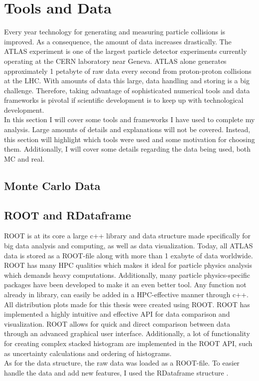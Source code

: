 \section{Tools and Data}
Every year technology for generating and measuring particle collisions is improved. 
As a consequence, the amount of data increases drastically. The ATLAS experiment
is one of the largest particle detector experiments currently operating at the 
CERN laboratory near Geneva. ATLAS alone generates approximately 1 petabyte of raw
data every second from proton-proton collisions at the \ac{LHC}. 
With amounts of data this large, data handling and storing is a big challenge. 
Therefore, taking advantage of sophisticated numerical tools and data frameworks is
pivotal if scientific development is to keep up with technological development.
\\
In this section I will cover some tools and frameworks I have used to 
complete my analysis. Large amounts of details and explanations will not be covered. 
Instead, this section will highlight which tools were used and some motivation
for choosing them. Additionally, I will cover some details regarding the data
being used, both \ac{MC} and real.
\subsection{Monte Carlo Data}
\subsection{ROOT and RDataframe}
ROOT \cite{ROOT} is at its core a large c++ library and data structure made specifically for big data
analysis and computing, as well as data visualization. Today, all ATLAS data is stored as a ROOT-file along
with more than 1 exabyte of data worldwide. ROOT has many \ac{HPC} qualities which makes it ideal for particle
physics analysis which demands heavy computations. Additionally, many particle physics-specific packages
have been developed to make it an even better tool. Any function not already in library,
can easily be added in a \ac{HPC}-effective manner through c++.
\\
All distribution plots made for this thesis were created using ROOT. ROOT has implemented a highly intuitive and
effective \ac{API} for data comparison and visualization. ROOT allows for quick and direct 
comparison between data through an advanced graphical user interface. Additionally, a lot of
functionality for creating complex stacked histogram are implemented in the ROOT \ac{API}, such
as uncertainty calculations and ordering of histograms.
\\
As for the data structure, the raw data was loaded as a ROOT-file. To easier handle the data and add
new features, I used the RDataframe structure \cite{RDataFrame}.
